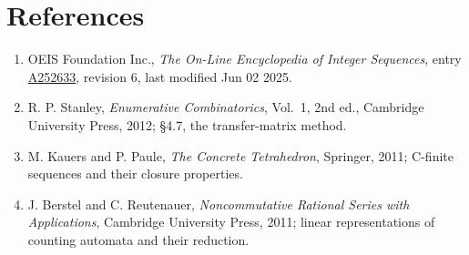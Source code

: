 \documentclass[11pt]{article}
\theoremstyle{definition}
\begin{document}
\section{References}

\begin{enumerate}

\item OEIS Foundation Inc., \emph{The On-Line Encyclopedia of Integer Sequences}, entry \href{https://oeis.org/A252633}{A252633}, revision 6, last modified Jun 02 2025.

\item R. P. Stanley, \emph{Enumerative Combinatorics}, Vol.~1, 2nd ed., Cambridge University Press, 2012; \S4.7, the transfer-matrix method.

\item M. Kauers and P. Paule, \emph{The Concrete Tetrahedron}, Springer, 2011; C-finite sequences and their closure properties.

\item J. Berstel and C. Reutenauer, \emph{Noncommutative Rational Series with Applications}, Cambridge University Press, 2011; linear representations of counting automata and their reduction.

\end{enumerate}
\end{document}
